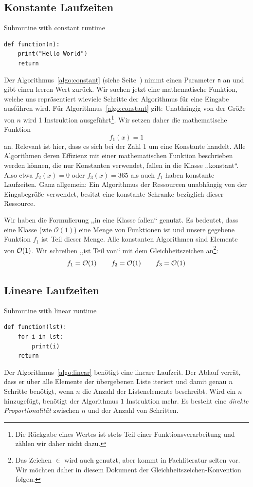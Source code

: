 \subsection{Konstante Laufzeiten}
%
\begin{algorithm}[p]
\caption{Subroutine with constant runtime}
\label{algo:constant}
\begin{lstlisting}
def function(n):
    print("Hello World")
    return
\end{lstlisting}
\end{algorithm}
%
Der Algorithmus~\ref{algo:constant} (siehe Seite~\pageref{algo:constant}) nimmt einen Parameter \texttt{n} an und gibt einen leeren Wert zurück. Wir suchen jetzt eine mathematische Funktion, welche uns repräsentiert wieviele Schritte der Algorithmus für eine Eingabe ausführen wird. Für Algorithmus~\ref{algo:constant} gilt: Unabhängig von der Größe von $n$ wird 1 Instruktion ausgeführt\footnote{Die Rückgabe eines Wertes ist stets Teil einer Funktionsverarbeitung und zählen wir daher nicht dazu.}. Wir setzen daher die mathematische Funktion
\[
  f_1(x) = 1
\]
an. Relevant ist hier, dass es sich bei der Zahl $1$ um eine Konstante handelt. Alle Algorithmen deren Effizienz mit einer mathematischen Funktion beschrieben werden können, die nur Konstanten verwendet, fallen in die Klasse ,,konstant``. Also etwa $f_2(x) = 0$ oder $f_3(x) = 365$ als auch $f_1$ haben konstante Laufzeiten. Ganz allgemein: Ein Algorithmus der Ressourcen unabhängig von der Eingabegröße verwendet, besitzt eine konstante Schranke bezüglich dieser Ressource.

Wir haben die Formulierung ,,in eine Klasse fallen`` genutzt. Es bedeutet, dass eine Klasse (wie $\mathcal{O}(1)$) eine Menge von Funktionen ist und unsere gegebene Funktion $f_1$ ist Teil dieser Menge. Alle konstanten Algorithmen sind Elemente von $\mathcal{O}\!\left(1\right)$. Wir schreiben ,,ist Teil von`` mit dem Gleichheitszeichen an\footnote{Das Zeichen $\in$ wird auch genutzt, aber kommt in Fachliteratur selten vor. Wir möchten daher in diesem Dokument der Gleichheitszeichen-Konvention folgen.}:
\[
    f_1 = \mathcal{O}\!\left(1\right) \qquad f_2 = \mathcal{O}\!\left(1\right) \qquad f_3 = \mathcal{O}\!\left(1\right)
\]
%
\subsection{Lineare Laufzeiten}
%
\begin{algorithm}[p]
\caption{Subroutine with linear runtime}
\label{algo:linear}
\begin{lstlisting}
def function(lst):
    for i in lst:
        print(i)
    return
\end{lstlisting}
\end{algorithm}
%
Der Algorithmus~\ref{algo:linear} benötigt eine lineare Laufzeit. Der Ablauf verrät, dass er über alle Elemente der übergebenen Liste iteriert und damit genau $n$ Schritte benötigt, wenn $n$ die Anzahl der Listenelemente beschreibt. Wird ein $n$ hinzugefügt, benötigt der Algorithmus $1$ Instruktion mehr. Es besteht eine \emph{direkte Proportionalität} zwischen $n$ und der Anzahl von Schritten.

